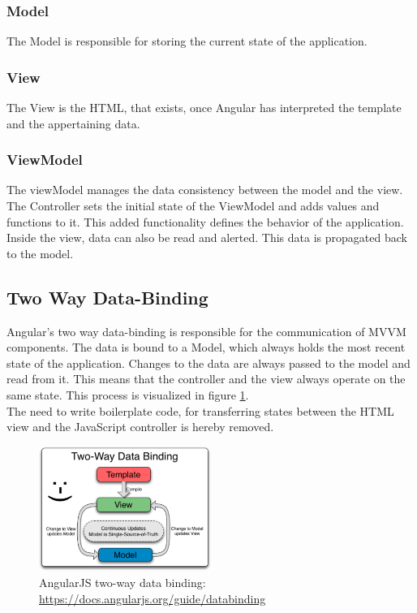 \subsubsection{Model}
The Model  is responsible for storing the current state of the application.

\subsubsection{View}
The View is the HTML, that exists, once Angular has interpreted the template and the appertaining data.

\subsubsection{ViewModel}
The viewModel manages the data consistency between the model and the view. The Controller sets the initial state of the ViewModel and adds values and functions to it. This added functionality defines the behavior of the application. Inside the view, data can also be read and alerted. This data is propagated back to the model.


\subsection{Two Way Data-Binding}
\label{sec:tw-binding}
Angular's two way data-binding is responsible for the communication of MVVM components. The data is bound to a Model, which always holds the most recent state of the application. Changes to the data are always passed to the model and read from it. This means that the controller and the view always operate on the same state. This process is visualized in figure \ref{fig:tw-databinding}.\\
The need to write boilerplate code, for transferring states between the HTML view and the JavaScript controller is hereby removed.

\begin{figure}[H]
	\centering\includegraphics[width=0.5\textwidth]{res/Two_Way_Data_Binding}
	\caption{AngularJS two-way data binding: \url{https://docs.angularjs.org/guide/databinding}}
	\label{fig:tw-databinding}
\end{figure}


